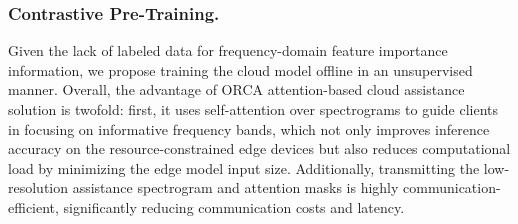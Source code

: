 \subsubsection{Contrastive Pre-Training.}  Given the lack of labeled data for frequency-domain feature importance information, we propose training the cloud model offline in an unsupervised manner.  Overall, the advantage of ORCA attention-based cloud assistance solution is twofold: first, it uses self-attention over spectrograms to guide clients in focusing on informative frequency bands, which not only improves inference accuracy on the resource-constrained edge devices but also reduces computational load by minimizing the edge model input size. Additionally, transmitting the low-resolution assistance spectrogram and attention masks is highly communication-efficient, significantly reducing communication costs and latency.



